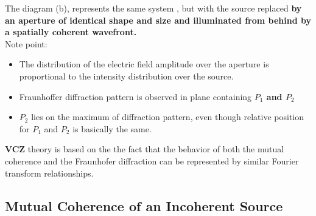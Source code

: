\documentclass[10pt]{report}
\begin{document}
The diagram (b), represents the same system , but with the source replaced \textbf{by an aperture of identical shape and size and illuminated from behind by a spatially coherent wavefront.}\\
Note point: 
\begin{itemize}
\item The distribution of the electric field amplitude over the aperture is proportional to the intensity distribution over the source.
\item Fraunhoffer diffraction pattern is observed in plane containing \textbf{$P_1$ and $P_2$} 
\item $P_2$ lies on the maximum of diffraction pattern, even though relative position for $P_1$ and $P_2$ is basically the same.
\end{itemize}

\textbf{VCZ} theory is based on the the fact that the behavior of both the mutual coherence and the Fraunhofer diffraction can be represented by similar Fourier transform relationships.
 
\subsection{Mutual Coherence of an Incoherent Source}
 
\end{document}
